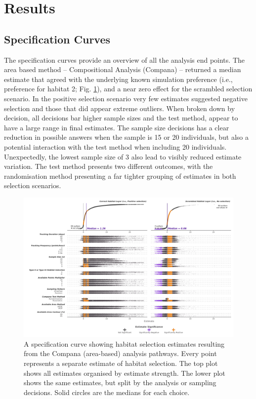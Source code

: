 \documentclass[10pt,a4paper]{article}
\begin{document}
\section{Results}\label{results}

\subsection{Specification Curves}\label{specification-curves}

The specification curves provide an overview of all the analysis end points.
The area based method -- Compositional Analysis (Compana) -- returned a median estimate that agreed with the underlying known simulation preference (i.e., preference for habitat 2; Fig. \ref{fig:specCurveArea}), and a near zero effect for the scrambled selection scenario.
In the positive selection scenario very few estimates suggested negative selection and those that did appear extreme outliers.
When broken down by decision, all decisions bar higher sample sizes and the test method, appear to have a large range in final estimates.
The sample size decisions has a clear reduction in possible answers when the sample is 15 or 20 individuals, but also a potential interaction with the test method when including 20 individuals.
Unexpectedly, the lowest sample size of 3 also lead to visibly reduced estimate variation.
The test method presents two different outcomes, with the randomisation method presenting a far tighter grouping of estimates in both selection scenarios.

\begin{figure}
\includegraphics[width=1\linewidth]{../figures/area_specCurve} \caption{A specification curve showing habitat selection estimates resulting from the Compana (area-based) analysis pathways. Every point represents a separate estimate of habitat selection. The top plot shows all estimates organised by estimate strength. The lower plot shows the same estimates, but split by the analysis or sampling decisions. Solid circles are the medians for each choice.}\label{fig:specCurveArea}
\end{figure}
\end{document}
